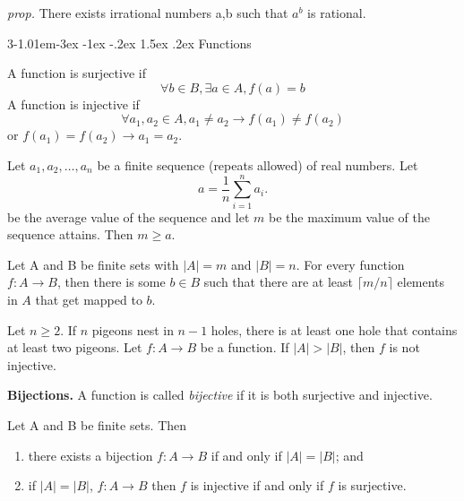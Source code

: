 \documentclass{tufte-handout}
\makeatletter
\renewcommand{\section}{\@startsection{section}%
    {3}{-1.01em}{-3ex \@plus -1ex \@minus -.2ex}%
    {1.5ex \@plus .2ex}
    {\hspace*{-5.5em}\fcolorbox{blue}{blue}{\parbox[c][1.0ex][b]{4em}{\phantom{space}}}
    \normalfont\Large\itshape\color{blue}}}
\makeatother
\begin{document}
\begin{Proposition}
    \textit{prop.} There exists irrational numbers a,b such that \( a^b \) is rational.
\end{Proposition}


\section{Functions}
\begin{Definition}
    A function is surjective if 
    \[\forall b \in B, \exists a \in A, f(a) = b\]
    A function is injective if 
    \[\forall a_1, a_2 \in A, a_1 \neq a_2 \rightarrow f(a_1) \neq f(a_2)\]
    or $  f(a_1) = f(a_2)  \rightarrow a_1 = a_2$.
\end{Definition}

\begin{Theorem}
    Let \( a_1,a_2,\ldots,a_n \) be a finite sequence (repeats allowed) of real numbers. Let
    \[a = \frac{1}{n} \sum_{i=1}^{n} a_i.\]
    be the average value of the sequence and let \( m \) 
    be the maximum value of the sequence attains. Then \( m \geq a \).
\end{Theorem}

\begin{Theorem}
    Let A and B be finite sets with \( \left|A\right| = m\) and \( \left|B\right| = n \).
    For every function \( f:A \to B \), then there is some \( b \in B \) such that
    there are at least \( \lceil m/n \rceil \) elements in \( A \) that get mapped to \( b \).
\end{Theorem}

\begin{Corollary}
    Let \( n \geq 2 \). If \( n \) pigeons nest in \( n-1 \) holes, there is at least one hole that contains at least two pigeons.
    Let \( f:A \to B \) be a function. 
    If \( \left|A\right| > \left|B\right| \), then \( f \) is not injective.
\end{Corollary}

\textbf{Bijections.} A function is called \textit{bijective} if it is both surjective and injective.

\begin{Proposition}
    Let A and B be finite sets. Then
    \begin{enumerate}
        \item there exists a bijection \( f:A\to B \) if and only if \( \left|A\right| = \left|B\right| \); and
        \item if \(\left|A\right| = \left|B\right| \), \( f:A\to B \) then \( f \) is injective if and only if \( f \) is surjective.
    \end{enumerate}
\end{Proposition}
\end{document}
